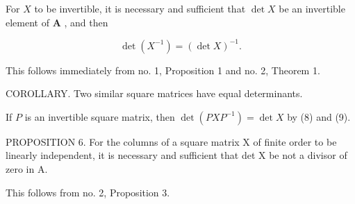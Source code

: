 For \(X\) to be invertible, it is necessary and sufficient that \(\det X\) be an invertible element of \(\mathbf{A}\) , and then

\[
\det (X ^ {- 1}) = (\det X) ^ {- 1}.\tag{9}
\]

This follows immediately from no. 1, Proposition 1 and no. 2, Theorem 1.

COROLLARY. Two similar square matrices have equal determinants.

If \(P\) is an invertible square matrix, then \(\det(PXP^{-1}) = \det X\) by (8) and (9).

PROPOSITION 6. For the columns of a square matrix X of finite order to be linearly independent, it is necessary and sufficient that det X be not a divisor of zero in A.

This follows from no. 2, Proposition 3.

